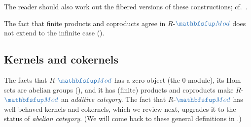 The reader should also work out the fibered versions of these
constructions; cf.\
.

The fact that finite products and coproducts agree in
$R$-$\categ{Mod}$ does not extend to the infinite case
().

\subsection{Kernels and cokernels}
\label{subsec:rings:kernels-and-cokernels}
The facts that $R$-$\categ{Mod}$ has a zero-object (the $0$-module),
its Hom sets are abelian groups
(), and it has (finite)
products and coproducts make $R$-$\categ{Mod}$ an \emph{additive
  category}. The fact that $R$-$\categ{Mod}$ has well-behaved kernels
and cokernels, which we review next, upgrades it to the status of
\emph{abelian category}. (We will come back to these general
definitions in
.)

